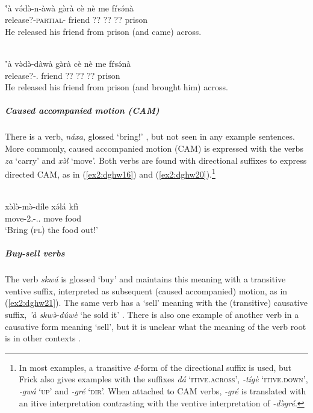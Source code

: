 \ea\label{ex2:dghw23}
 \\
\gll ʽà və́də̀-n-àwà gə̀rà cè nè me fŕsə́nà \\
 release?-\textsc{partial}- friend ?? ?? ?? prison \\
\glt He released his friend from prison (and came) across.

\ex\label{ex2:dghw22}
 \\
\gll ʽà və̀də̀-dàwà gə̀rà cè nè me fŕsə́nà \\
 release?-. friend ?? ?? ?? prison \\
\glt He released his friend from prison (and brought him) across.
\z 

\subparagraph{Caused accompanied motion (CAM)}

There is a verb, \textit{náxa}, glossed `bring!' \citep[14]{frickPhonologyDghwede1977}, but not seen in any example sentences. More commonly, caused accompanied motion (CAM) is expressed with the verbs \textit{za} `carry' and \textit{xə̀l} `move'. Both verbs are found with  directional suffixes to express directed CAM, as in (\ref{ex2:dghw16}) and (\ref{ex2:dghw20}).\footnote{In most examples, a transitive \textit{d}-form of the directional suffix is used, but Frick also gives examples with the suffixes \textit{dá} `\textsc{itive.across}', \textit{-tígè} `\textsc{itive.down}', \textit{-gwá} `\textsc{up}' and \textit{-gré} `\textsc{dir}'. When attached to CAM verbs, \textit{-gré} is translated with an itive interpretation contrasting with the ventive interpretation of \textit{-də̀gré}. }

\ea\label{ex2:dghw20}
 \\
\gll xə̀lə̀-mə̀-díle xə́lá kfì \\
move-2.-.. move food	\\
\glt `Bring (\textsc{pl}) the food out!'
\z

\subparagraph{Buy-sell verbs}

The verb \textit{skwá} is glossed `buy' and maintains this meaning with a transitive ventive suffix, interpreted as subsequent (caused accompanied) motion, as in (\ref{ex2:dghw21}). The same verb has a `sell' meaning with the (transitive) causative suffix, \textit{'à skwə̀-dúwè} `he sold it' \citep[43]{frickVerbalSystemDghwede1978}. There is also one example of another verb in a causative form meaning `sell', but it is unclear what the meaning of the verb root is in other contexts \citep[25]{frickVerbalSystemDghwede1978}. 

